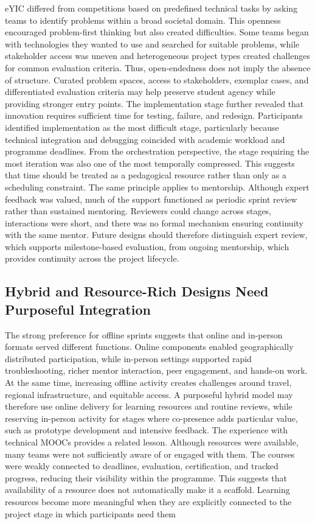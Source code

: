 \documentclass[runningheads]{llncs}
\begin{document}
eYIC differed from competitions based on predefined technical tasks by asking teams to identify problems within a broad societal domain. This openness encouraged problem-first thinking but also created difficulties. Some teams began with technologies they wanted to use and searched for suitable problems, while stakeholder access was uneven and heterogeneous project types created challenges for common evaluation criteria. Thus, open-endedness does not imply the absence of structure. Curated problem spaces, access to stakeholders, exemplar cases, and differentiated evaluation criteria may help preserve student agency while providing stronger entry points. The implementation stage further revealed that innovation requires sufficient time for testing, failure, and redesign. Participants identified implementation as the most difficult stage, particularly because technical integration and debugging coincided with academic workload and programme deadlines. From the orchestration perspective, the stage requiring the most iteration was also one of the most temporally compressed. This suggests that time should be treated as a pedagogical resource rather than only as a scheduling constraint. The same principle applies to mentorship. Although expert feedback was valued, much of the support functioned as periodic sprint review rather than sustained mentoring. Reviewers could change across stages, interactions were short, and there was no formal mechanism ensuring continuity with the same mentor. Future designs should therefore distinguish expert review, which supports milestone-based evaluation, from ongoing mentorship, which provides continuity across the project lifecycle.

\subsection{Hybrid and Resource-Rich Designs Need Purposeful Integration}

The strong preference for offline sprints suggests that online and in-person formats served different functions. Online components enabled geographically distributed participation, while in-person settings supported rapid troubleshooting, richer mentor interaction, peer engagement, and hands-on work. At the same time, increasing offline activity creates challenges around travel, regional infrastructure, and equitable access. A purposeful hybrid model may therefore use online delivery for learning resources and routine reviews, while reserving in-person activity for stages where co-presence adds particular value, such as prototype development and intensive feedback. The experience with technical MOOCs provides a related lesson. Although resources were available, many teams were not sufficiently aware of or engaged with them. The courses were weakly connected to deadlines, evaluation, certification, and tracked progress, reducing their visibility within the programme. This suggests that availability of a resource does not automatically make it a scaffold. Learning resources become more meaningful when they are explicitly connected to the project stage in which participants need them
\end{document}

